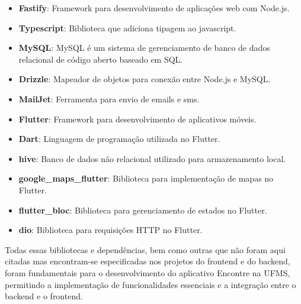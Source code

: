\begin{itemize}
  \item \textbf{Fastify}: Framework para desenvolvimento de aplicações web com Node.js.
  \item \textbf{Typescript}: Biblioteca que adiciona tipagem ao javascript.
  \item \textbf{MySQL}: MySQL é um sistema de gerenciamento de banco de dados relacional de código aberto baseado em SQL.
  \item \textbf{Drizzle}: Mapeador de objetos para conexão entre Node.js e MySQL.
  \item \textbf{MailJet}: Ferramenta para envio de emails e sms.
  \item \textbf{Flutter}: Framework para desenvolvimento de aplicativos móveis.
  \item \textbf{Dart}: Linguagem de programação utilizada no Flutter.
  \item \textbf{hive}: Banco de dados não relacional utilizado para armazenamento local.
  \item \textbf{google\_maps\_flutter}: Biblioteca para implementação de mapas no Flutter.
  \item \textbf{flutter\_bloc}: Biblioteca para gerenciamento de estados no Flutter.
  \item \textbf{dio}: Biblioteca para requisições HTTP no Flutter.
\end{itemize}

Todas essas bibliotecas e dependências, bem como outras que não foram aqui citadas mas encontram-se especificadas nos projetos do frontend e do backend, foram fundamentais para o desenvolvimento do aplicativo Encontre na UFMS, permitindo a implementação de funcionalidades essenciais e a integração entre o backend e o frontend.